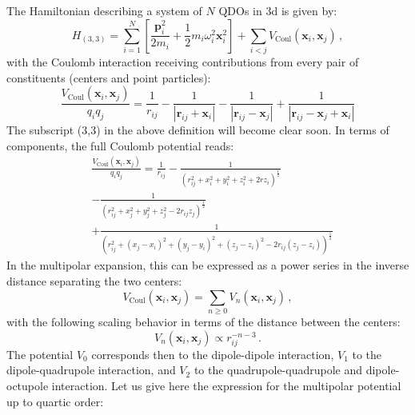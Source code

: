 \documentclass[reprint, amsmath, amssymb, aps]{revtex4-2}
\begin{document}
        The Hamiltonian describing a system of $N$ QDOs in 3d is given by:
        \begin{equation}
        \label{eq:full_QDO_Hamiltonian}
            H_{(3,3)}=\sum_{i=1}^N\left[\frac{\bm{p} _i^2}{2m_i} + \frac{1}{2}m_i\omega_i^2\bm{x} _i^2\right] +\sum_{i<j}V_\text{Coul}\left(\bm{x} _i, \bm{x} _j\right)\,,
        \end{equation}
        with the Coulomb interaction receiving contributions from every pair of constituents (centers and point particles):
        \begin{equation}
        \label{eq:full_coulomb_potential}
            \frac{V_\text{Coul}\left(\bm{x} _i, \bm{x} _j\right)}{q_iq_j}=\frac{1}{r_{ij}} - \frac{1}{|\bm{r}_{ij}  + \bm{x} _i|} - \frac{1}{|\bm{r}_{ij}  - \bm{x} _j|} + \frac{1}{|\bm{r}_{ij} - \bm{x} _j + \bm{x} _i|}
        \end{equation}
        The subscript (3,3) in the above definition will become clear soon.
        In terms of components, the full Coulomb potential reads:
        \begin{align}
            &\frac{V_\text{Coul}(\bm{x} _i, \bm{x} _j)}{q_iq_j} = \frac{1}{r_{ij}} - \frac{1}{\left(r_{ij}^2 + x_i^2+y_i^2+z_i^2+2rz_i\right)^{\frac{1}{2}}}\nonumber \\
            &- \frac{1}{\left(r_{ij}^2 + x_j^2+y_j^2+z_j^2-2r_{ij}z_j\right)^{\frac{1}{2}}} \\
            &+\frac{1}{\left(r_{ij}^2 + (x_j-x_i)^2+(y_j-y_i)^2+(z_j-z_i)^2-2r_{ij}(z_j-z_i)\right)^{\frac{1}{2}}}\nonumber
        \end{align}
        In the multipolar expansion, this can be expressed as a power series in the inverse distance separating the two centers:
        \begin{equation}
            V_\text{Coul}\left(\bm{x} _i, \bm{x} _j\right)= \sum_{n\geq 0} V_n\left(\bm{x} _i, \bm{x} _j\right)\,,
        \end{equation}
        with the following scaling behavior in terms of the distance between the centers:
        \begin{equation}
            V_n\left(\bm{x} _i, \bm{x} _j\right)\propto r_{ij}^{-n-3}\,.
        \end{equation}
        The potential $V_0$ corresponds then to the dipole-dipole interaction, $V_1$ to the dipole-quadrupole interaction, and $V_2$ to the quadrupole-quadrupole and dipole-octupole interaction.
        Let us give here the expression for the multipolar potential up to quartic order:
\end{document}
